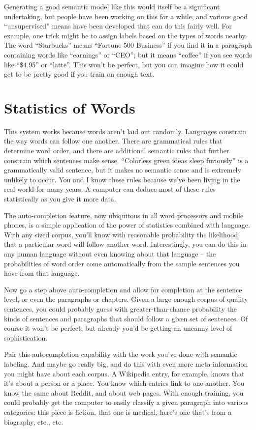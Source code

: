 \documentclass[
  Letterpaper,
]{scrbook}
\begin{document}
Generating a good semantic model like this would itself be a significant
undertaking, but people have been working on this for a while, and
various good ``unsupervised'' means have been developed that can do this
fairly well. For example, one trick might be to assign labels based on
the types of words nearby. The word ``Starbucks'' means ``Fortune 500
Business'' if you find it in a paragraph containing words like
``earnings'' or ``CEO''; but it means ``coffee'' if you see words like
``\$4.95'' or ``latte''. This won't be perfect, but you can imagine how
it could get to be pretty good if you train on enough text.

\section{Statistics of Words}\label{statistics-of-words}

This system works because words aren't laid out randomly. Languages
constrain the way words can follow one another. There are grammatical
rules that determine word order, and there are additional semantic rules
that further constrain which sentences make sense. ``Colorless green
ideas sleep furiously'' is a grammatically valid sentence, but it makes
no semantic sense and is extremely unlikely to occur. You and I know
these rules because we've been living in the real world for many years.
A computer can deduce most of these rules statistically as you give it
more data.

The auto-completion feature, now ubiquitous in all word processors and
mobile phones, is a simple application of the power of statistics
combined with language. With any sized corpus, you'll know with
reasonable probability the likelihood that a particular word will follow
another word. Interestingly, you can do this in any human language
without even knowing about that language -- the probabilities of word
order come automatically from the sample sentences you have from that
language.

Now go a step above auto-completion and allow for completion at the
sentence level, or even the paragraphs or chapters. Given a large enough
corpus of quality sentences, you could probably guess with
greater-than-chance probability the kinds of sentences and paragraphs
that should follow a given set of sentences. Of course it won't be
perfect, but already you'd be getting an uncanny level of
sophistication.

Pair this autocompletion capability with the work you've done with
semantic labeling. And maybe go really big, and do this with even more
meta-information you might have about each corpus. A Wikipedia entry,
for example, knows that it's about a person or a place. You know which
entries link to one another. You know the same about Reddit, and about
web pages. With enough training, you could probably get the computer to
easily classify a given paragraph into various categories: this piece is
fiction, that one is medical, here's one that's from a biography, etc.,
etc.
\end{document}
